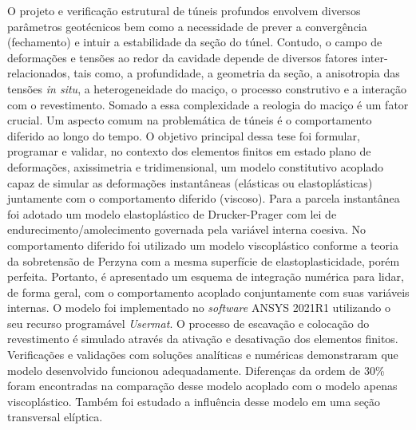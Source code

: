 O projeto e verificação estrutural de túneis profundos envolvem diversos parâmetros geotécnicos bem como a necessidade de prever a convergência (fechamento) e intuir a estabilidade da seção do túnel. Contudo, o campo de deformações e tensões ao redor da cavidade depende de diversos fatores inter-relacionados, tais como, a profundidade, a geometria da seção, a anisotropia das tensões \textit{in situ}, a heterogeneidade do maciço, o processo construtivo e a interação com o revestimento. Somado a essa complexidade a reologia do maciço é um fator crucial. Um aspecto comum na problemática de túneis é o comportamento diferido ao longo do tempo. O objetivo principal dessa tese foi formular, programar e validar, no contexto dos elementos finitos em estado plano de deformações, axissimetria e tridimensional, um modelo constitutivo acoplado capaz de simular as deformações instantâneas (elásticas ou elastoplásticas) juntamente com o comportamento diferido (viscoso). Para a parcela instantânea foi adotado um modelo elastoplástico de Drucker-Prager com lei de endurecimento/amolecimento governada pela variável interna coesiva. No comportamento diferido foi utilizado um modelo viscoplástico conforme a teoria da sobretensão de Perzyna com a mesma superfície de elastoplasticidade, porém perfeita. Portanto, é apresentado um esquema de integração numérica para lidar, de forma geral, com o comportamento acoplado conjuntamente com suas variáveis internas. O modelo foi implementado no \textit{software} ANSYS 2021R1 utilizando o seu recurso programável \textit{Usermat}. O processo de escavação e colocação do revestimento é simulado através da ativação e desativação dos elementos finitos. Verificações e validações com soluções analíticas e numéricas demonstraram que modelo desenvolvido funcionou adequadamente. Diferenças da ordem de 30\% foram encontradas na comparação desse modelo acoplado com o modelo apenas viscoplástico. Também foi estudado a influência desse modelo em uma seção transversal elíptica.